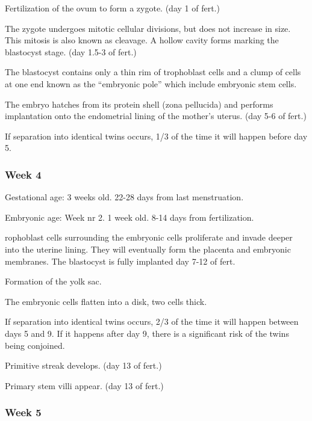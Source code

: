 \documentclass[12pt,a4paper,onecolumn]{article}
\begin{document}
\begin{wuxch_item}
    \item Fertilization of the ovum to form a zygote. (day 1 of fert.)
    \item The zygote undergoes mitotic cellular divisions, but does not increase in size. This
      mitosis is also known as cleavage. A hollow cavity forms marking the blastocyst stage. (day
      1.5-3 of fert.)
    \item The blastocyst contains only a thin rim of trophoblast cells and a clump of cells at
      one end known as the ``embryonic pole'' which include embryonic stem cells.
    \item The embryo hatches from its protein shell (zona pellucida) and performs implantation
      onto the endometrial lining of the mother's uterus. (day 5-6 of fert.)
    \item If separation into identical twins occurs, 1/3 of the time it will happen before day 5.
\end{wuxch_item}

\subsubsection{Week 4}

Gestational age: 3 weeks old. 22-28 days from last menstruation.

Embryonic age: Week nr 2. 1 week old. 8-14 days from fertilization.

\begin{wuxch_item}
    \item rophoblast cells surrounding the embryonic cells proliferate and invade deeper into the uterine lining. They will eventually form the placenta and embryonic membranes. The blastocyst is fully implanted day 7-12 of fert. 
    \item Formation of the yolk sac.
    \item The embryonic cells flatten into a disk, two cells thick.
    \item If separation into identical twins occurs, 2/3 of the time it will happen between days 5 and 9. If it happens after day 9, there is a significant risk of the twins being conjoined.
    \item Primitive streak develops. (day 13 of fert.)
    \item Primary stem villi appear. (day 13 of fert.)
\end{wuxch_item}

\subsubsection{Week 5}
\end{document}
